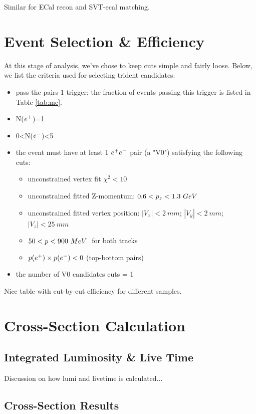 \documentclass[twoside]{article}
\begin{document}
Similar for ECal recon and SVT-ecal matching.   




\section{Event Selection \& Efficiency}

At this stage of analysis, we've chose to keep cuts simple and fairly loose.  Below, we list the criteria used for selecting trident candidates: 
\begin{itemize}
\item pass the  pairs-1 trigger; the fraction of events passing this trigger is listed in Table \ref{tab:mc}. 
\item N($e^+$)=1
\item  0<N($e^-$)<5
\item the event must have at least 1 $e^+e^-$ pair (a "V0") satisfying the following cuts:
\begin{itemize}
\item unconstrained vertex fit $\chi^2<10$
\item unconstrained fitted Z-momentum: $0.6<p_z<1.3~GeV~$
\item unconstrained fitted vertex position:  $|V_x|<2~mm$; $|V_y|<2~mm$; $|V_z|<25~mm$
\item $50<p<900~MeV~$ for both tracks
\item $p(e^+)\times p(e^-)<0$ (top-bottom pairs)
\end{itemize}
\item the number of V0 candidates cuts = 1
\end{itemize}

Nice table with cut-by-cut efficiency for different samples. 



\section{Cross-Section Calculation}

\subsection{Integrated Luminosity \& Live Time}

Discussion on how lumi and livetime  is calculated...

\subsection{Cross-Section Results}
\end{document}

